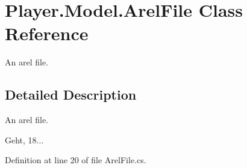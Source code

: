 \section{Player.\-Model.\-Arel\-File Class Reference}
\label{class_player_1_1_model_1_1_arel_file}


An arel file.  




\subsection{Detailed Description}
An arel file. 

Geht, 18... 

Definition at line 20 of file Arel\-File.\-cs.

